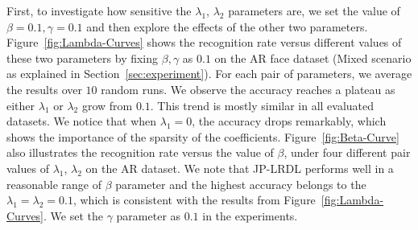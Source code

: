 \documentclass[journal]{IEEEtran}
\begin{document}
First, to investigate how sensitive the $\lambda_1$, $\lambda_2$ parameters are, we set the value of $\beta=0.1, \gamma=0.1$ and then explore the effects of the other two parameters. Figure~\ref{fig:Lambda-Curves} shows the recognition rate versus different values of these two parameters by fixing $\beta,\gamma$ as $0.1$ on the AR face dataset (Mixed scenario as explained in Section~\ref{sec:experiment}). For each pair of parameters, we average the results over $10$ random runs. We observe the accuracy reaches a plateau as either $\lambda_1$ or $\lambda_2$ grow from $0.1$. This trend is mostly similar in all evaluated datasets. We notice that when $\lambda_1=0$, the accuracy drops remarkably, which shows the importance of the sparsity of the coefficients. 
Figure~\ref{fig:Beta-Curve} also illustrates the recognition rate versus the value of $\beta$, under four different pair values of $\lambda_1$, $\lambda_2$ on the AR dataset. We note that JP-LRDL performs well in a reasonable range of $\beta$ parameter and the highest accuracy belongs to the $\lambda_1 =\lambda_2=0.1$, which is consistent with the results from Figure~\ref{fig:Lambda-Curves}. We set the $\gamma$ parameter as $0.1$ in the experiments.
\end{document}
